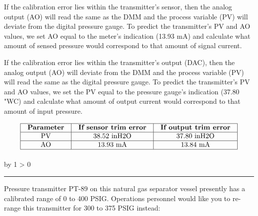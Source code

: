 \documentclass[12pt,a4paper]{article}
\def\oppgave{
            \advance\questnum by 1
            \ifnum \questnum > 0
                 \hrule
                 \vskip 3pt
                 \leftline{Oppgave \the\questnum}
                 \vskip 3pt \fi}
\begin{document}
\vskip 10pt

\filbreak

If the calibration error lies within the transmitter's sensor, then the analog output (AO) will read the same as the DMM and the process variable (PV) will deviate from the digital pressure gauge.  To predict the transmitter's PV and AO values, we set AO equal to the meter's indication (13.93 mA) and calculate what amount of sensed pressure would correspond to that amount of signal current.

\vskip 10pt

If the calibration error lies within the transmitter's output (DAC), then the analog output (AO) will deviate from the DMM and the process variable (PV) will read the same as the digital pressure gauge.  To predict the transmitter's PV and AO values, we set the PV equal to the pressure gauge's indication (37.80 "WC) and calculate what amount of output current would correspond to that amount of input pressure.

$$\vbox{\offinterlineskip
\halign{\strut
\vrule \quad\hfil # \ \hfil & 
\vrule \quad\hfil # \ \hfil & 
\vrule \quad\hfil # \ \hfil \vrule \cr
\noalign{\hrule}
%
{\bf Parameter} & {\bf If sensor trim error} & {\bf If output trim error} \cr
%
\noalign{\hrule}
%
PV & 38.52 inH2O & 37.80 inH2O \cr
%
\noalign{\hrule}
%
AO & 13.93 mA & 13.84 mA \cr
%
\noalign{\hrule}
} %
}$$ %



\vfil \eject 


\oppgave{} 

Pressure transmitter PT-89 on this natural gas separator vessel presently has a calibrated range of 0 to 400 PSIG.  Operations personnel would like you to re-range this transmitter for 300 to 375 PSIG instead:
\end{document}
